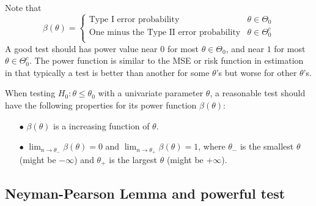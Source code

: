 Note that 
\[
    \beta(\theta) = \begin{cases}
        \text{Type I error probability} & \theta \in \Theta_0\\
        \text{One minus the Type II error probability} & \theta \in \Theta^c_0\\
    \end{cases}
\]
A good test should has power value near $0$ for most $\theta \in \Theta_0$, and near $1$ for most 
$\theta \in \Theta^c_0$. The power function is similar to the MSE or risk function in
 estimation in that typically a test is better than another for some $\theta$'s but worse for other 
 $\theta$'s.

 When testing $H_0 : \theta \leq \theta_0$ with a univariate parameter $\theta$, a reasonable test 
 should have the following properties for its power function $\beta(\theta)$:

 \begin{itemize}
    \item[$\bullet$] $\beta(\theta)$ is a increasing function of $\theta$.
    \item[$\bullet$] $\lim_{n \to \theta_-} \beta(\theta) = 0$ and $\lim_{n \to \theta_+} \beta(\theta) = 1$, where 
    $\theta_-$ is the smallest $\theta$ (might be $-\infty$) and $\theta_+$ is the largest $\theta$ (might be $+\infty$).
 \end{itemize}

\subsection{Neyman-Pearson Lemma and powerful test}

